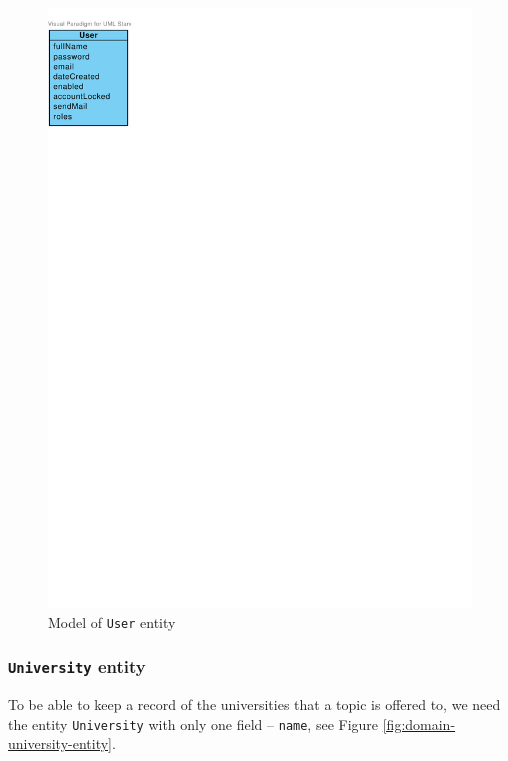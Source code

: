 \begin{figure}[h]
    \centering
        \includegraphics[trim=0 675 480 30, clip, keepaspectratio, scale=0.8]{./images/domain-user-entity.pdf}
    \caption{Model of \texttt{User} entity}
    \label{fig:domain-user-entity}
\end{figure}

\subsubsection{\textbf{\texttt{University} entity}}

To be able to keep a record of the universities that a topic is offered to, we need the entity \texttt{University} with only one field -- \texttt{name}, see Figure \ref{fig:domain-university-entity}.

